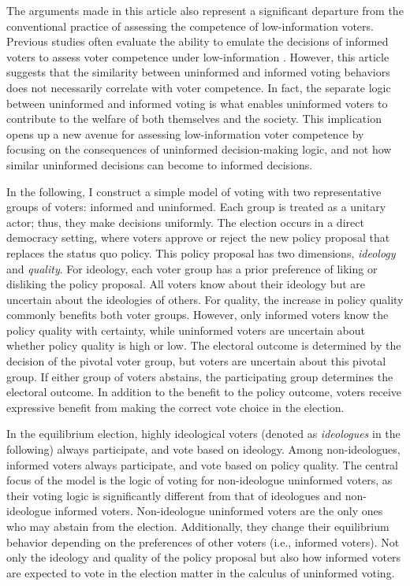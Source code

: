 \documentclass[doc,natbib,12pt]{apa6}
\begin{document}
	\par The arguments made in this article also represent a significant departure from the conventional practice of assessing the competence of low-information voters. Previous studies often evaluate the ability to emulate the decisions of informed voters to assess voter competence under low-information \citep{Lupia1994shve, Lupia1998thde, Lau2001adan, Boudreau2009clth}. However, this article suggests that the similarity between uninformed and informed voting behaviors does not necessarily correlate with voter competence. In fact, the separate logic between uninformed and informed voting is what enables uninformed voters to contribute to the welfare of both themselves and the society. This implication opens up a new avenue for assessing low-information voter competence by focusing on the consequences of uninformed decision-making logic, and not how similar uninformed decisions can become to informed decisions. 
	
	\par In the following, I construct a simple model of voting with two representative groups of voters: informed and uninformed. Each group is treated as a unitary actor; thus, they make decisions uniformly. The election occurs in a direct democracy setting, where voters approve or reject the new policy proposal that replaces the status quo policy. This policy proposal has two dimensions, \textit{ideology} and \textit{quality}. For ideology, each voter group has a prior preference of liking or disliking the policy proposal. All voters know about their ideology but are uncertain about the ideologies of others. For quality, the increase in policy quality commonly benefits both voter groups. However, only informed voters know the policy quality with certainty, while uninformed voters are uncertain about whether policy quality is high or low. The electoral outcome is determined by the decision of the pivotal voter group, but voters are uncertain about this pivotal group. If either group of voters abstains, the participating group determines the electoral outcome. In addition to the benefit to the policy outcome, voters receive expressive benefit from making the correct vote choice in the election.
	
	\par In the equilibrium election, highly ideological voters (denoted as \textit{ideologues} in the following) always participate, and vote based on ideology. Among non-ideologues, informed voters always participate, and vote based on policy quality. The central focus of the model is the logic of voting for non-ideologue uninformed voters, as their voting logic is significantly different from that of ideologues and non-ideologue informed voters. Non-ideologue uninformed voters are the only ones who may abstain from the election. Additionally, they change their equilibrium behavior depending on the preferences of other voters (i.e., informed voters). Not only the ideology and quality of the policy proposal but also how informed voters are expected to vote in the election matter in the calculus of uninformed voting.
	
\end{document}

